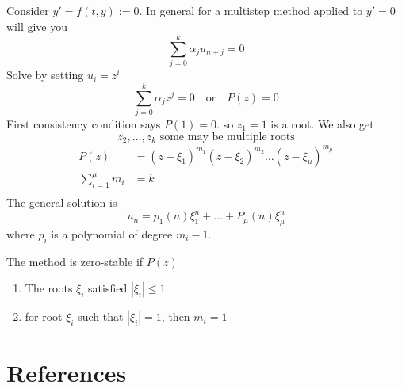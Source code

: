 \documentclass{article}
\theoremstyle{remark}
\newcommand{\newpara}
  {
  \vskip 0.4cm
  }
\begin{document}
\newpara
Consider $y'  = f\left( t,y \right) := 0$.  In general for a multistep method applied to $y'  = 0$ will give you \[
\sum_{j=0}^{k}  \alpha _{j} u_{n+j} = 0
\] 
Solve by setting $u_{i} = z^{i}$ \[
\sum_{j=0}^{k} \alpha _{j} z^{j} = 0 \quad \text{or}\quad  P\left( z \right) = 0  
\] 
First consistency condition says $P\left( 1 \right) = 0$.  so $z_{1} = 1$ is a root. We also get \[
z_{2} , \ldots , z_{k}  \text{ some may be multiple roots}
\] 
\[
  \begin{split}
  P\left( z \right)  & = \left( z- \xi _{1} \right)^{m_{1}} \left( z - \xi _{2} \right)^{m_{2}} \ldots \left( z - \xi _{\mu } \right) ^{ m_{\mu }} \\
  \sum_{i=1}^{\mu }  m_{i} &=  k \\
  \end{split} 
\] 
The general solution is \[
u_{n} = p_{1} \left( n \right) \xi ^{n}_{1} + \ldots + P _{\mu }\left( n \right) \xi ^{n}_{\mu }
\] 
where $p_{i}$ is a polynomial of degree $m_{i} -1$.

\begin{definition}
  The method is zero-stable  if $ P\left( z \right) $  
  \begin{enumerate}[label=(\roman*)]
    \item The roots $\xi _{i}$ satisfied $\left\lvert \xi _{i} \right\rvert  \le 1$
    \item for root $\xi _{i}$ such that $\left\lvert \xi _{i} \right\rvert  = 1$, then $m_{i} = 1$
  \end{enumerate}
\end{definition}



\newpage

\section{References}%
\label{sec:references}



  



\end{document}
